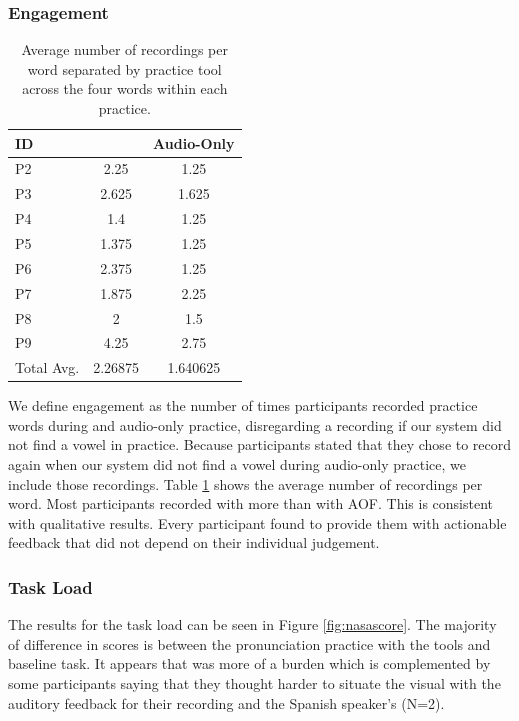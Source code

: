 \subsubsection{Engagement} 
\begin{table}[]
    \begin{tabular}{l|cc}
    ID & \multicolumn{1}{l}{\visowel{}} & \multicolumn{1}{l}{Audio-Only} \\
    \hline
    P2             & 2.25                              & 1.25                           \\
    P3             & 2.625                             & 1.625                          \\
    P4             & 1.4                               & 1.25                           \\
    P5             & 1.375                             & 1.25                           \\
    P6             & 2.375                             & 1.25                           \\
    P7             & 1.875                             & 2.25                           \\
    P8             & 2                                 & 1.5                            \\
    P9             & 4.25                              & 2.75                           \\
    \hline
    \hline
    Total Avg.     & 2.26875                           & 1.640625                      
    \end{tabular}
    \caption{Average number of recordings per word separated by practice tool across the four words within each practice.}
    \label{tab:engagement}
\end{table}
We define engagement as the number of times participants recorded practice words during \visowel{} and audio-only practice, disregarding a recording if our system did not find a vowel in \visowel{} practice. Because participants stated that they chose to record again when our system did not find a vowel during audio-only practice, we include those recordings. Table \ref{tab:engagement} shows the average number of recordings per word. Most participants recorded with \visowel{} more than with AOF. This is consistent with qualitative results. Every participant found \visowel{} to provide them with actionable feedback that did not depend on their individual judgement. 

\subsubsection{Task Load}
The results for the task load can be seen in Figure \ref{fig:nasascore}. The majority of difference in scores is between the pronunciation practice with the tools and baseline task. It appears that \visowel{} was more of a burden which is complemented by some participants saying that they thought harder to situate the visual with the auditory feedback for their recording and the Spanish speaker's (N=2). 

